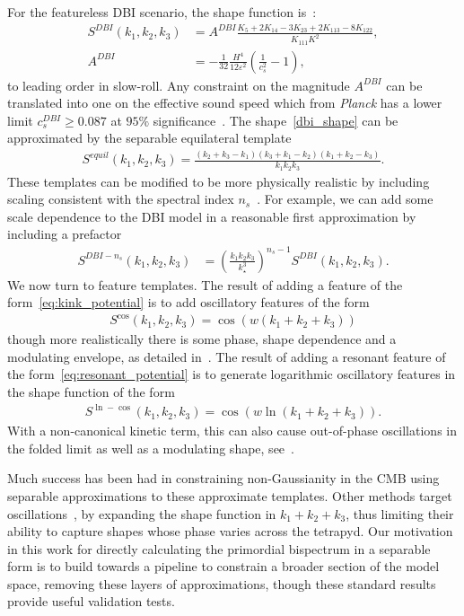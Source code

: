 \documentclass[a4paper,12pt]{extarticle}
\begin{document}
For the featureless DBI scenario, the shape function is~\cite{dbi_in_the_sky}:
\begin{align}\label{dbi_shape}
    S^{DBI}(k_1,k_2,k_3) &= A^{DBI}\frac{K_5+2K_{14}-3K_{23}+2K_{113}-8K_{122}}{K_{111}K^2},\\
    A^{DBI} &= -\frac{1}{32}\frac{H^4}{12\varepsilon^2}\left(\frac{1}{c_s^2}-1\right),
\end{align}
to leading order in slow-roll.
Any constraint on the magnitude $A^{DBI}$ can be translated into one 
on the effective sound speed which from \textit{Planck} has a lower limit $c_s^{DBI} \geq 0.087$
at $95\%$ significance~\cite{Planck_NG_2015}.
The shape~\eqref{dbi_shape} can be approximated by the separable equilateral template
\begin{align}\label{equil_shape}
    S^{equil}(k_1,k_2,k_3) = \frac{(k_2+k_3-k_1)(k_3+k_1-k_2)(k_1+k_2-k_3)}{k_1k_2k_3}.
\end{align}
These templates can be modified to be more physically realistic by including
scaling consistent with the spectral index $n_s$~\cite{Planck_NG_2015}.
For example, we can add some scale dependence to the DBI model in a reasonable first approximation by including a prefactor
\begin{align}\label{dbi_ns_shape}
    S^{DBI-n_s}(k_1,k_2,k_3) &= {\left(\frac{k_1k_2k_3}{k^3_\star}\right)}^{n_s-1}S^{DBI}(k_1,k_2,k_3).
\end{align}
We now turn to feature templates.
The result of adding a feature of the form~\eqref{eq:kink_potential}
is to add oscillatory features of the form
\begin{align}\label{cos_shape}
    S^{\cos}(k_1,k_2,k_3) = \cos(w(k_1+k_2+k_3))
\end{align}
though more realistically there is some phase, shape dependence and a modulating envelope,
as detailed in~\cite{adshead}.
The result of adding a resonant feature of the form~\eqref{eq:resonant_potential}
is to generate logarithmic oscillatory features in the shape function of the form
\begin{align}\label{ln_cos_shape}
    S^{\ln-\cos}(k_1,k_2,k_3) = \cos(w\ln(k_1+k_2+k_3)).
\end{align}
With a non-canonical kinetic term, this can also
cause out-of-phase oscillations in the folded limit as well as a modulating shape,
see~\cite{chen_folded_resonant}.


Much success has been had in constraining non-Gaussianity
in the CMB using separable approximations to these approximate templates.
Other methods target oscillations~\cite{reso_estimator}, by expanding the shape function
in $k_1+k_2+k_3$, thus limiting their ability to capture shapes whose
phase varies across the tetrapyd.
Our motivation in this work for directly calculating the primordial
bispectrum in a separable form is to build towards
a pipeline to constrain a broader section of the model space,
removing these layers of approximations,
though these standard results provide useful validation tests.
\end{document}
